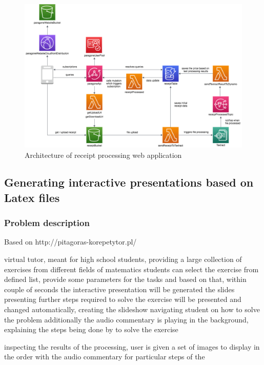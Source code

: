 \begin{figure}[H]
    \centering
    \includegraphics[width=1\textwidth]{assets/04-serverless-for-web-apps/paragoneArchitecture.png}
    \caption{Architecture of receipt processing web application}
    \label{fig:paragone-web-app}
\end{figure}

\subsection{Generating interactive presentations based on Latex files}

\subsubsection{Problem description}

Based on http://pitagoras-korepetytor.pl/

virtual tutor, meant for high school students, providing a large collection of exercises from different fields of matematics
students can select the exercise from defined list, provide some parameters for the tasks and based on that, within couple of seconds the interactive presentation will be generated
the slides presenting further steps required to solve the exercise will be presented and changed automatically, creating the slideshow navigating student on how to solve the problem
additionally the audio commentary is playing in the background, explaining the steps being done by to solve the exercise

inspecting the results of the processing, user is given a set of images to display in the order with the audio commentary for particular steps of the 

